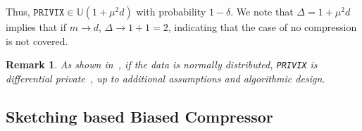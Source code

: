 \documentclass[twoside]{article}
\newtheorem{remark}{Remark}
\newtheorem{definition}{Definition}
\begin{document}
Thus, $\texttt{PRIVIX}\in \mathbb{U}(1+\mu^2 d)$ with probability $1-\delta$.
We note that $\Delta=1+\mu^2d$ implies that if $m\rightarrow d$, $\Delta\rightarrow 1+1=2$, indicating that the case of no compression is not covered. 


\begin{remark}
As shown in~\cite{li2019privacy}, if the data is normally distributed, \texttt{PRIVIX} is differential private~\cite{DBLP:conf/icalp/Dwork06}, up to additional assumptions and algorithmic design.  
\end{remark}

\vspace{-0.05in}
\subsection{Sketching based Biased Compressor}
\vspace{-0.05in}
\end{document}
